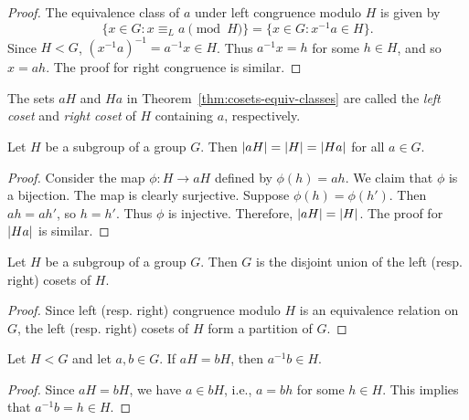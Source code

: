 \begin{proof}
    The equivalence class of \(a\) under left congruence modulo \(H\) is given
    by
    \[
        \{ x \in G : x \equiv_L a \pmod{H} \} = \{ x \in G : x^{-1}a \in H \}.
    \]
    Since \(H < G\), \((x^{-1}a)^{-1} = a^{-1}x \in H\). Thus \(a^{-1}x = h\)
    for some \(h \in H\), and so \(x = ah\). The proof for right congruence is
    similar.
\end{proof}

\begin{definition}
    The sets \(aH\) and \(Ha\) in Theorem~\ref{thm:cosets-equiv-classes} are
    called the \emph{left coset} and \emph{right coset} of \(H\) containing
    \(a\), respectively.
\end{definition}

\begin{theorem}
    Let \(H\) be a subgroup of a group \(G\). Then \(\lvert aH \rvert = \lvert H \rvert =
    \lvert Ha \rvert\) for all \(a \in G\).
\end{theorem}

\begin{proof}
    Consider the map \(\phi: H \to aH\) defined by \(\phi(h) = ah\). We claim
    that \(\phi\) is a bijection. The map is clearly surjective. Suppose
    \(\phi(h) = \phi(h')\). Then \(ah = ah'\), so \(h = h'\). Thus \(\phi\) is
    injective. Therefore, \(\lvert aH \rvert = \lvert H \rvert\). The proof for
    \(\lvert Ha \rvert\) is similar.
\end{proof}

\begin{theorem}
    Let \(H\) be a subgroup of a group \(G\). Then \(G\) is the disjoint union
    of the left (resp. right) cosets of \(H\).
\end{theorem}

\begin{proof}
    Since left (resp. right) congruence modulo \(H\) is an equivalence relation
    on \(G\), the left (resp. right) cosets of \(H\) form a partition of \(G\).
\end{proof}

\begin{theorem}
    Let \(H < G\) and let \(a, b \in G\). If \(aH = bH\), then \(a^{-1}b \in
    H\).
\end{theorem}

\begin{proof}
    Since \(aH = bH\), we have \(a \in bH\), i.e., \(a = bh\) for some \(h \in
    H\). This implies that \(a^{-1}b = h \in H\).
\end{proof}

